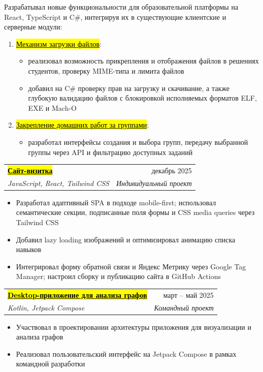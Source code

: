 \documentclass[letterpaper,10pt]{article}
\makeatletter
\let\oldhref\href
\renewcommand{\href}[2]{\oldhref{#1}{\sethlcolor{markeryellow}\hl{#2}}}
\newcommand{\resumeItem}[1]{
  \item\small{#1 \vspace{1pt}}
}
\newcommand{\resumeSubheading}[4]{
  \vspace{2pt}\item
    \begin{tabular*}{\linewidth}[t]{l@{\extracolsep{\fill}}r}
      \textbf{#1} & #2 \\
      \textit{\small#3} & \textit{\small #4} \\
    \end{tabular*}\vspace{-2pt}
}
\newcommand{\resumeItemListStart}{
  \begin{itemize}[
    leftmargin=0.22in,
    itemsep=0pt,
    topsep=4pt,
    parsep=0pt,
    partopsep=0pt
  ]
}
\newcommand{\resumeItemListEnd}{\end{itemize}\vspace{-2pt}}
\makeatother
\begin{document}
      \vspace{3pt}
    {\small
      Разрабатывал новые функциональности для образовательной платформы
      на React, TypeScript и C\#, интегрируя их в существующие клиентские
      и серверные модули:
    }
    \par
      \begin{enumerate}[
        leftmargin=0.26in,
        label=\arabic*.,
        itemsep=2pt,
        topsep=2pt,
        parsep=0pt,
        partopsep=0pt
      ]
        \item \small{
          \href{https://github.com/InteIIigeNET/HwProj-2.0.1/pull/636}
          {Механизм загрузки файлов}:
        }
        \resumeItemListStart
          \resumeItem{
            реализовал возможность прикрепления и отображения
            файлов в решениях студентов, проверку MIME-типа и лимита файлов
          }
          \resumeItem{
            добавил на C\# проверку прав на загрузку и скачивание,
            а также глубокую валидацию файлов с блокировкой исполняемых
            форматов ELF, EXE и Mach-O
          }
        \resumeItemListEnd

        \item \small{
          \href{https://github.com/InteIIigeNET/HwProj-2.0.1/pull/663}
          {Закрепление домашних работ за группами}:
        }
        \resumeItemListStart
          \resumeItem{
            разработал интерфейсы создания и выбора групп, передачу
            выбранной группы через API и фильтрацию доступных заданий
          }
          \resumeItemListEnd
      \end{enumerate}

  \vspace{4pt}
  \resumeSubheading
    {\href{https://github.com/semrosin/cv}{Сайт-визитка}}
    {декабрь 2025}
    {JavaScript, React, Tailwind CSS}
    {Индивидуальный проект}
    \resumeItemListStart
      \resumeItem{
        Разработал адаптивный SPA в подходе mobile-first; использовал
        семантические секции, подписанные поля формы и CSS media queries
        через Tailwind CSS
      }
      \resumeItem{
        Добавил lazy loading изображений и оптимизировал анимацию списка
        навыков
      }
      \resumeItem{
        Интегрировал форму обратной связи и Яндекс Метрику через
        Google Tag Manager; настроил сборку и публикацию сайта
        в GitHub Actions
      }
    \resumeItemListEnd

  \vspace{4pt}
  \resumeSubheading
    {\href{https://github.com/spbu-coding-2024/graphs-graphs-team-2}
     {Desktop-приложение для анализа графов}}
    {март -- май 2025}
    {Kotlin, Jetpack Compose}
    {Командный проект}
    \resumeItemListStart
      \resumeItem{
        Участвовал в проектировании архитектуры приложения
        для визуализации и анализа графов
      }
      \resumeItem{
        Реализовал пользовательский интерфейс на Jetpack Compose
        в рамках командной разработки
      }
    \resumeItemListEnd
\end{document}
